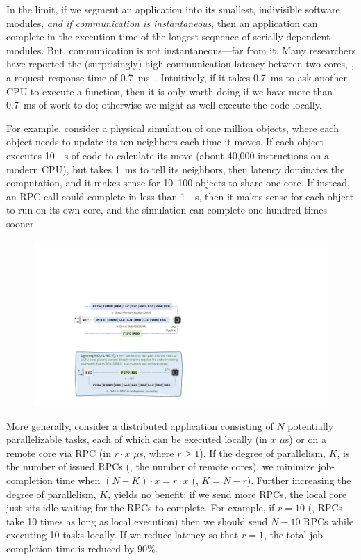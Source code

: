 In the limit, if we segment an application into its smallest, indivisible software modules, {\em and if communication is instantaneous}, then an application can complete in the execution time of the longest sequence of serially-dependent modules.
But, communication is not instantaneous---far from it. 
Many researchers have reported the (surprisingly) high communication latency between two cores, \eg, a request-response time of \SI{0.7}{ms}~\cite{eRPC, perfkit-grpc}.
Intuitively, if it takes \SI{0.7}{ms} to ask another CPU to execute a function, then it is only worth doing if we have more than \SI{0.7}{ms} of work to do; otherwise we might as well execute the code locally. 

For example, consider a physical simulation of one million objects, where each object needs to update its ten neighbors each time it moves. 
If each object executes \SI{10}{\mu s} of code to calculate its move (about 40,000 instructions on a modern CPU), but takes \SI{1}{ms} to tell its neighbors, then latency dominates the computation, and it makes sense for 10--100 objects to share one core. 
If instead, an RPC call could complete in less than \SI{1}{\mu s}, then it makes sense for each object to run on its own core, and the simulation can complete one hundred times sooner. 

\begin{figure}[t]
  \includegraphics[width=\linewidth]{./figures/lnic-fbox}
  \label{fig:lnic-fbox}
\end{figure}

More generally, consider a distributed application consisting of $N$ potentially parallelizable tasks, each of which can be executed locally (in $x$ $\mu$s) or on a remote core via RPC (in $r \cdot x$ $\mu$s, where $r \ge 1$). 
If the degree of parallelism, $K$, is the number of issued RPCs (\ie, the number of remote cores), we minimize job-completion time when $(N - K)\cdot x = r \cdot x$ (\ie, $K = N - r$). 
Further increasing the degree of parallelism, $K$, yields no benefit; if we send more RPCs, the local core just sits idle waiting for the RPCs to complete. 
For example, if $r = 10$ (\ie, RPCs take 10 times as long as local execution) then we should send $N-10$ RPCs while executing 10 tasks locally. 
If we reduce latency so that $r=1$, the total job-completion time is reduced by 90\%.  

